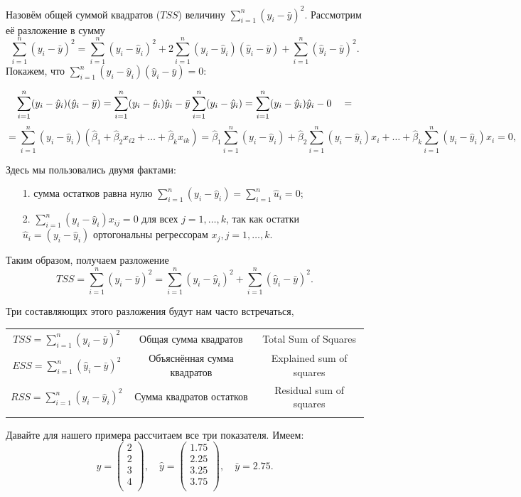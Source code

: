 \documentclass[12pt]{article}
\newcommand{\hb}{\hat{\beta}}
\newcommand{\hu}{\hat{u}}
\newcommand{\hy}{\hat{y}}
\newcommand{\RSS}{RSS}
\newcommand{\ESS}{ESS}
\newcommand{\TSS}{TSS}
\begin{document}
Назовём общей суммой квадратов ($\TSS$) величину $\sum_{i=1}^n (y_i - \bar{y})^2$. 
Рассмотрим её разложение в сумму
\[
\sum_{i=1}^n (y_i - \bar{y})^2 = \sum_{i=1}^n (y_i - \hy_i)^2 + 2\sum_{i=1}^n (y_i - \hy_i)(\hy_i - \bar{y}) + \sum_{i=1}^n (\hy_i - \bar{y})^2.
\]
Покажем, что $\sum_{i=1}^n (y_i - \hy_i)(\hy_i - \bar{y}) = 0$:

\[
\sum_{i=1}^n (y_i - \hat{y}_i)(\hat{y}_i - \bar{y}) = \sum_{i=1}^n (y_i - \hat{y}_i)\hat{y}_i - \bar{y}\sum_{i=1}^n (y_i - \hat{y}_i) \\
= \sum_{i=1}^n (y_i - \hat{y}_i)\hat{y}_i - 0 \quad =
\]
\[
= \sum_{i=1}^n (y_i - \hat{y}_i)(\hb_1 + \hb_2 x_{i2}+ \dots + \hb_k x_{ik} )
= \hb_1 \sum_{i=1}^n (y_i - \hat{y}_i) + \hb_2 \sum_{i=1}^n (y_i - \hat{y}_i)x_i + \dots + \hb_k \sum_{i=1}^n (y_i - \hat{y}_i)x_i = 0,
\]

Здесь мы пользовались двумя фактами:
\begin{enumerate}
    \item[1.] сумма остатков равна нулю $\sum_{i=1}^n (y_i - \hat{y}_i) = \sum_{i=1}^n \hu_i = 0$;
    \item[2.] $\sum_{i=1}^n (y_i - \hat{y}_i)x_{ij} = 0$ для всех $j=1,\dots,k$, так как остатки $\hu_i = (y_i - \hy_i)$ ортогональны регрессорам $x_j, j=1,\dots,k$.
\end{enumerate}


Таким образом, получаем разложение
\[
\TSS = \sum_{i=1}^n (y_i - \bar{y})^2 = \sum_{i=1}^n (y_i - \hy_i)^2 + \sum_{i=1}^n (\hy_i - \bar{y})^2.
\]

Три составляющих этого разложения будут нам часто встречаться,

    \begin{tabular}{ccc}
    \toprule
        $\TSS = \sum_{i=1}^n (y_i - \bar{y})^2$ & Общая сумма квадратов &  Total Sum of Squares   \\
        $\ESS = \sum_{i=1}^n (\hy_i - \bar{y})^2$ & Объяснённая сумма квадратов & Explained sum of squares  \\
        $\RSS = \sum_{i=1}^n (y_i - \hy_i)^2$ & Сумма квадратов остатков & Residual sum of squares  \\
    \bottomrule
    \label{tab:sum_of_squares}
    \end{tabular}

Давайте для нашего примера рассчитаем все три показателя. Имеем:
\[
y = \begin{pmatrix}
    2 \\
    2 \\
    3 \\
    4 \\
\end{pmatrix}, \quad \hy = \begin{pmatrix}
    1.75 \\
    2.25 \\
    3.25 \\
    3.75 \\
\end{pmatrix}, \quad \bar{y} = 2.75.
\]
\end{document}
